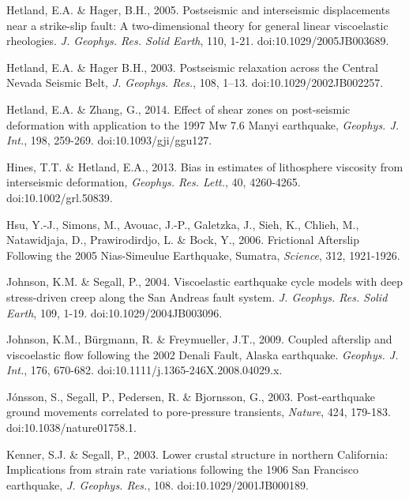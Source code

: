 \documentclass[extra]{gji}
\begin{document}
\begin{thebibliography}{}
 Hetland, E.A. \& Hager,
  B.H., 2005. Postseismic and interseismic displacements near a
  strike-slip fault: A two-dimensional theory for general linear
  viscoelastic rheologies. \textit{J. Geophys. Res. Solid Earth}, 110,
  1-21. doi:10.1029/2005JB003689.

 Hetland, E.A. \& Hager B.H.,
  2003. Postseismic relaxation across the Central Nevada Seismic Belt,
  \textit{J. Geophys. Res.}, 108,
  1–13. doi:10.1029/2002JB002257.

 Hetland, E.A. \& Zhang, G.,
  2014. Effect of shear zones on post-seismic deformation with
  application to the 1997 Mw 7.6 Manyi earthquake, \textit{Geophys. J.
    Int.}, 198, 259-269. doi:10.1093/gji/ggu127.

 Hines, T.T. \&
  Hetland, E.A., 2013. Bias in estimates of lithosphere viscosity from
  interseismic deformation, \textit{Geophys. Res. Lett.}, 40,
  4260-4265. doi:10.1002/grl.50839.

 Hsu, Y.-J., Simons, M., Avouac,
  J.-P., Galetzka, J., Sieh, K., Chlieh, M., Natawidjaja, D.,
  Prawirodirdjo, L. \& Bock, Y., 2006. Frictional Afterslip Following
  the 2005 Nias-Simeulue Earthquake, Sumatra, \textit{Science}, 312,
  1921-1926.

 Johnson, K.M. \& Segall,
  P., 2004. Viscoelastic earthquake cycle models with deep
  stress-driven creep along the San Andreas fault
  system. \textit{J. Geophys.  Res. Solid Earth}, 109,
  1-19. doi:10.1029/2004JB003096.

Johnson, K.M.,
  B\"urgmann, R. \& Freymueller, J.T., 2009. Coupled afterslip and
  viscoelastic flow following the 2002 Denali Fault, Alaska
  earthquake. \textit{Geophys. J.  Int.}, 176,
  670-682. doi:10.1111/j.1365-246X.2008.04029.x.

 J\'onsson, S.,
  Segall, P., Pedersen, R. \& Bjornsson, G., 2003. Post-earthquake
  ground movements correlated to pore-pressure transients,
  \textit{Nature}, 424, 179-183. doi:10.1038/nature01758.1.

 Kenner, S.J. \& Segall, P.,
  2003. Lower crustal structure in northern California: Implications
  from strain rate variations following the 1906 San Francisco
  earthquake, \textit{J. Geophys. Res.},
  108. doi:10.1029/2001JB000189.


\end{thebibliography}
\end{document}
